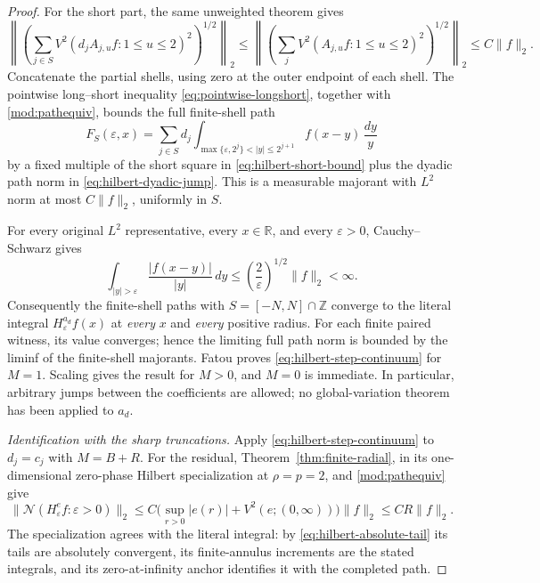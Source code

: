\documentclass[11pt]{article}
\numberwithin{equation}{section}
\theoremstyle{remark}
\theoremstyle{definition}
\newcommand{\R}{\mathbb R}
\newcommand{\NN}{\mathcal N}
\begin{document}
\begin{proof}
For the short part, the same unweighted theorem gives
\begin{equation}\label{eq:hilbert-short-bound}
 \left\|\left(\sum_{j\in S}
 V^2(d_j A_{j,u}f:1\le u\le2)^2\right)^{1/2}\right\|_2
 \le\left\|\left(\sum_j
 V^2(A_{j,u}f:1\le u\le2)^2\right)^{1/2}\right\|_2
 \le C\|f\|_2.
\end{equation}
Concatenate the partial shells, using zero at the outer endpoint of
each shell. The pointwise long--short inequality
\eqref{eq:pointwise-longshort}, together with
\eqref{mod:pathequiv}, bounds the full finite-shell path
\[
 F_S(\varepsilon,x)=\sum_{j\in S}d_j
 \int_{\max\{\varepsilon,2^j\}<|y|\le2^{j+1}}
 f(x-y)\,\frac{dy}{y}
\]
by a fixed multiple of the short square in
\eqref{eq:hilbert-short-bound} plus the dyadic path norm in
\eqref{eq:hilbert-dyadic-jump}. This is a measurable majorant with
$L^2$ norm at most $C\|f\|_2$, uniformly in $S$.

For every original $L^2$ representative, every $x\in\R$, and every
$\varepsilon>0$, Cauchy--Schwarz gives
\begin{equation}\label{eq:hilbert-absolute-tail}
 \int_{|y|>\varepsilon}\frac{|f(x-y)|}{|y|}\,dy
 \le\left(\frac2\varepsilon\right)^{1/2}\|f\|_2<\infty.
\end{equation}
Consequently the finite-shell paths with $S=[-N,N]\cap\mathbb Z$
converge to the literal integral $H^{a_d}_\varepsilon f(x)$ at
\emph{every} $x$ and \emph{every} positive radius. For each finite
paired witness, its value converges; hence the limiting full path norm
is bounded by the liminf of the finite-shell majorants. Fatou proves
\eqref{eq:hilbert-step-continuum} for $M=1$. Scaling gives the result
for $M>0$, and $M=0$ is immediate. In particular, arbitrary jumps
between the coefficients are allowed; no global-variation theorem
has been applied to $a_d$.

\emph{Identification with the sharp truncations.}
Apply \eqref{eq:hilbert-step-continuum} to $d_j=c_j$ with $M=B+R$.
For the residual, Theorem~\ref{thm:finite-radial}, in its
one-dimensional zero-phase Hilbert specialization at $\rho=p=2$,
and \eqref{mod:pathequiv} give
\[
 \|\NN(H^e_\varepsilon f:\varepsilon>0)\|_2
 \le C\bigl(\sup_{r>0}|e(r)|+V^2(e;(0,\infty))\bigr)\|f\|_2
 \le C R\|f\|_2.
\]
The specialization agrees with the literal integral: by
\eqref{eq:hilbert-absolute-tail} its tails are absolutely convergent,
its finite-annulus increments are the stated integrals, and its
zero-at-infinity anchor identifies it with the completed path.


\end{proof}
\end{document}
